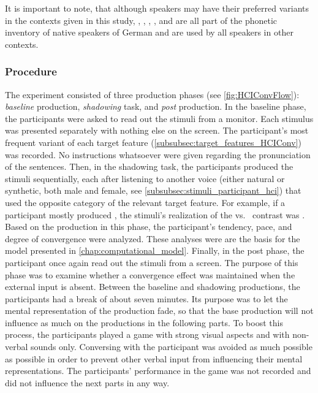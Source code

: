It is important to note, that although speakers may have their preferred variants in the contexts given in this study, \textipa{[E:]}, \textipa{[e:]}, \textipa{[Ik]}, \textipa{[\s n]}, and \textipa{[@n]} are all part of the phonetic inventory of native speakers of German and are used by all speakers in other contexts.

\subsubsection{Procedure}
\label{subsubsec:procedure_hci}

The experiment consisted of three production phases (see \cref{fig:HCIConvFlow}): \emph{baseline} production, \emph{shadowing} task, and \emph{post} production.
In the baseline phase, the participants were asked to read out the stimuli from a monitor.
Each stimulus was presented separately with nothing else on the screen.
The participant's most frequent variant of each target feature (\cref{subsubsec:target_features_HCIConv}) was recorded.
No instructions whatsoever were given regarding the pronunciation of the sentences.
Then, in the shadowing task, the participants produced the stimuli sequentially, each after listening to another voice (either natural or synthetic, both male and female, see \cref{subsubsec:stimuli_participant_hci}) that used the opposite category of the relevant target feature.
For example, if a participant mostly produced \textipa{[\c{c}]}, the stimuli's realization of the \textipa{[\c{c}]} vs.\ \textipa{[k]} contrast was \textipa{[k]}.
Based on the production in this phase, the participant's tendency, pace, and degree of convergence were analyzed.
These analyses were are the basis for the model presented in \cref{chap:computational_model}.
Finally, in the post phase, the participant once again read out the stimuli from a screen.
The purpose of this phase was to examine whether a convergence effect was maintained when the external input is absent.
Between the baseline and shadowing productions, the participants had a break of about seven minutes.
Its purpose was to let the mental representation of the production fade, so that the base production will not influence as much on the productions in the following parts.
To boost this process, the participants played a game with strong visual aspects and with non-verbal sounds only.
Conversing with the participant was avoided as much possible as possible in order to prevent other verbal input from influencing their mental representations.
The participants' performance in the game was not recorded and did not influence the next parts in any way.
